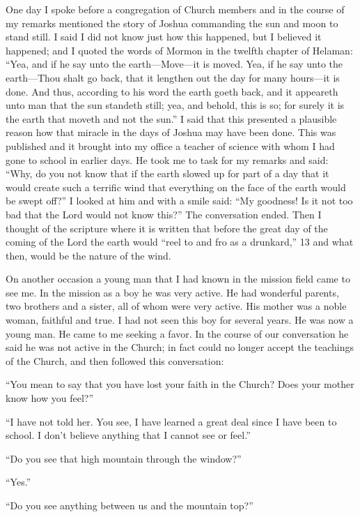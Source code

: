 One day I spoke before a congregation of Church members and in the course of my remarks
mentioned the story of Joshua commanding the sun and moon to stand still. I said I did not
know just how this happened, but I believed it happened; and I quoted the words of Mormon
in the twelfth chapter of Helaman: ``Yea, and if he say unto the earth—Move—it is moved.
Yea, if he say unto the earth—Thou shalt go back, that it lengthen out the day for many
hours—it is done. And thus, according to his word the earth goeth back, and it appeareth unto
man that the sun standeth still; yea, and behold, this is so; for surely it is the earth that
moveth and not the sun.'' I said that this presented a plausible reason how that miracle in the
days of Joshua may have been done. This was published and it brought into my office a
teacher of science with whom I had gone to school in earlier days. He took me to task for my
remarks and said: ``Why, do you not know that if the earth slowed up for part of a day that it
would create such a terrific wind that everything on the face of the earth would be swept
off?'' I looked at him and with a smile said: ``My goodness! Is it not too bad that the Lord
would not know this?'' The conversation ended. Then I thought of the scripture where it is
written that before the great day of the coming of the Lord the earth would ``reel to and fro as
a drunkard,'' 13 and what then, would be the nature of the wind.

On another occasion a young man that I had known in the mission field came to see me. In
the mission as a boy he was very active. He had wonderful parents, two brothers and a sister,
all of whom were very active. His mother was a noble woman, faithful and true. I had not
seen this boy for several years. He was now a young man. He came to me seeking a favor. In
the course of our conversation he said he was not active in the Church; in fact could no
longer accept the teachings of the Church, and then followed this conversation:

``You mean to say that you have lost your faith in the Church? Does your mother know how
you feel?''

``I have not told her. You see, I have learned a great deal since I have been to school. I don't
believe anything that I cannot see or feel.''

``Do you see that high mountain through the window?''

``Yes.''

``Do you see anything between us and the mountain top?''

